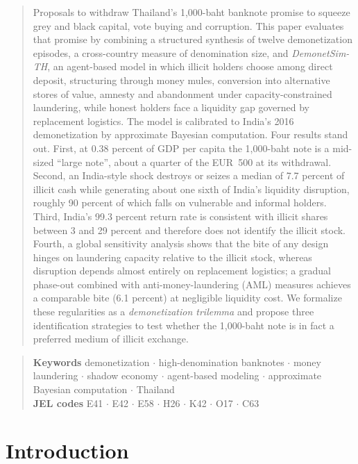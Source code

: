 \documentclass[11pt]{article}
\theoremstyle{definition}
\theoremstyle{remark}
\begin{document}
\begin{quote}\small
Proposals to withdraw Thailand's 1,000-baht banknote promise to squeeze grey and black capital, vote buying and
corruption. This paper evaluates that promise by combining a structured synthesis of twelve demonetization episodes, a
cross-country measure of denomination size, and \textit{DemonetSim-TH}, an agent-based model in which illicit holders
choose among direct deposit, structuring through money mules, conversion into alternative stores of value, amnesty and
abandonment under capacity-constrained laundering, while honest holders face a liquidity gap governed by replacement
logistics. The model is calibrated to India's 2016 demonetization by approximate Bayesian computation. Four results stand
out. First, at 0.38 percent of GDP per capita the 1,000-baht note is a mid-sized ``large note'', about a quarter of the
EUR~500 at its withdrawal. Second, an India-style shock destroys or seizes a median of 7.7 percent of illicit cash while
generating about one sixth of India's liquidity disruption, roughly 90 percent of which falls on vulnerable and informal
holders. Third, India's 99.3 percent return rate is consistent with illicit shares between 3 and 29 percent and therefore
does not identify the illicit stock. Fourth, a global sensitivity analysis shows that the bite of any design hinges on
laundering capacity relative to the illicit stock, whereas disruption depends almost entirely on replacement logistics;
a gradual phase-out combined with anti-money-laundering (AML) measures achieves a comparable bite (6.1 percent) at negligible
liquidity cost. We formalize these regularities as a \textit{demonetization trilemma} and propose three identification
strategies to test whether the 1,000-baht note is in fact a preferred medium of illicit exchange.
\end{quote}
\begin{quote}\small
\textbf{Keywords} demonetization $\cdot$ high-denomination banknotes $\cdot$ money laundering $\cdot$ shadow economy
$\cdot$ agent-based modeling $\cdot$ approximate Bayesian computation $\cdot$ Thailand\\[3pt]
\textbf{JEL codes} E41 $\cdot$ E42 $\cdot$ E58 $\cdot$ H26 $\cdot$ K42 $\cdot$ O17 $\cdot$ C63
\end{quote}
\vspace{4pt}

\section{Introduction}
\end{document}

